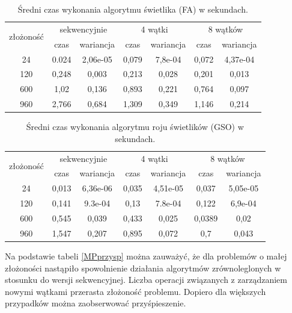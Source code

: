 \documentclass[11pt,a4paper,twoside]{article}
\begin{document}
\bgroup
\def\arraystretch{1.1}
\begin{table}[ht]
\caption{Średni czas wykonania algorytmu świetlika (FA) w sekundach.}
\label{wspólnaFA}
\centering
\begin{tabular}{|c||c|c||c|c||c|c|}
\hline
 \multirow{2}{*}{złożoność} & \multicolumn{2}{c||}{sekwencyjnie} & \multicolumn{2}{c||}{4 wątki} & \multicolumn{2}{c|}{8 wątków} \\\cline{2-7}
 & czas & wariancja & czas & wariancja & czas & wariancja \\\hline
 24 & 0.024 & 2,06e-05 & 0,079 & 7,8e-04 & 0,072& 4,37e-04\\\hline
 120 & 0,248 & 0,003 & 0,213 & 0,028 & 0,201 & 0,013 \\\hline
 600 & 1,02 & 0,136 & 0,893 & 0,221 & 0,764 & 0,097 \\\hline
 960 & 2,766 & 0,684 & 1,309 & 0,349 & 1,146 & 0,214 \\\hline
\end{tabular}
\end{table}
\egroup

\bgroup
\def\arraystretch{1.1}
\begin{table}[ht]
\caption{Średni czas wykonania algorytmu roju świetlików (GSO) w sekundach.}
\label{wspólnaGSO}
\centering
\begin{tabular}{|c||c|c||c|c||c|c|}
\hline
 \multirow{2}{*}{złożoność} & \multicolumn{2}{c||}{sekwencyjnie} & \multicolumn{2}{c||}{4 wątki} & \multicolumn{2}{c|}{8 wątków} \\\cline{2-7}
 & czas & wariancja & czas & wariancja & czas & wariancja \\\hline
 24 & 0,013 & 6,36e-06 & 0,035 & 4,51e-05 & 0,037 & 5,05e-05\\\hline
 120 & 0,141 & 9.3e-04 & 0,13 & 7.8e-04 & 0,122 & 6,9e-04 \\\hline
 600 & 0,545 & 0,039 & 0,433 & 0,025 & 0,0389 & 0,02 \\\hline
 960 & 1,547 & 0,207 & 0,895 & 0,072 & 0,7 & 0,043 \\\hline
\end{tabular}
\end{table}
\egroup
\vspace*{1\baselineskip}

Na podstawie tabeli \ref{MPprzysp} można zauważyć, że dla problemów o małej złożoności nastąpiło spowolnienie działania algorytmów zrównoleglonych w stosunku do wersji sekwencyjnej. Liczba operacji związanych z zarządzaniem nowymi wątkami przerasta złożoność problemu. Dopiero dla większych przypadków można zaobserwować przyśpieszenie.
\end{document}
